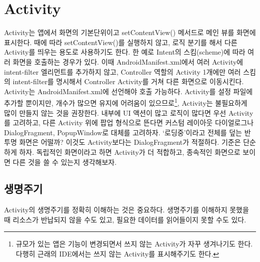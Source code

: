 \chapter{Activity}
Activity는 앱에서 화면의 기본단위이고 setContentView() 메서드로 메인 뷰를 화면에 표시한다.
때에 따라 setContentView()를 실행하지 않고, 로직 분기를 해서 다른 Activity를 띄우는 용도로 사용하기도 한다.
한 예로 Intent의 스킴(scheme)에 따라 여러 화면을 호출하는 경우가 있다. 
이때 AndroidManifest.xml에서 여러 Activity에 intent-filter 엘리먼트를 추가하지 않고, Controller 역할의 Activity 1개에만 여러 스킴의 intent-filter를 명시해서 Controller Activity를 거쳐 다른 화면으로 이동시킨다.\\

Activity는 AndroidManifest.xml에 선언해야 호출 가능하다. 
Activity를 설정 파일에 추가할 뿐이지만, 개수가 많으면 유지에 어려움이 있으므로\footnote{규모가 있는 앱은 기능이 변경되면서 쓰지 않는 Activity가 자꾸 생겨나기도 한다. 다행히 근래의 IDE에서는 쓰지 않는 Activity를 표시해주기도 한다.}, Activity는 불필요하게 많이 만들지 않는 것을 권장한다.
내부에 UI 액션이 많고 로직이 많다면 우선 Activity를 고려하고, 
다른 Activity 위에 팝업 형식으로 뜬다면 커스텀 레이아웃 다이얼로그나 DialogFragment, PopupWindow로 대체를 고려하자.
`로딩중'이라고 전체를 덮는 반투명 화면은 어떨까? 이것도 Activity보다는 DialogFragment가 적절하다.
기준은 단순하게 하자. 독립적인 화면이라고 하면 Activity가 더 적합하고, 종속적인 화면으로 보이면 다른 것을 쓸 수 있는지 생각해보자.\\

\section{생명주기}
Activity의 생명주기를 정확히 이해하는 것은 중요하다. 
생명주기를 이해하지 못했을 때 리소스가 반납되지 않을 수도 있고, 필요한 데이터를 읽어들이지 못할 수도 있다.

